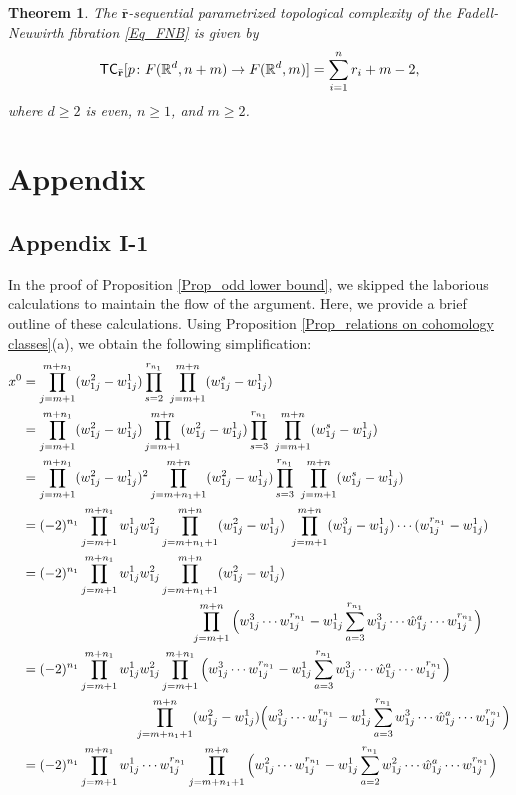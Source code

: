 \documentclass[12pt,oneside,reqno]{amsart}
\theoremstyle{plain}
\newtheorem{theorem}{Theorem}[section]
\theoremstyle{definition}
\theoremstyle{remark}
\newcommand{\sect}{\setcounter{figure}{0}\section}
\newcommand{\TC}{{\sf {TC}}}
\newcommand{\br}{\bar{\mathbf{r}}}
\begin{document}
\begin{theorem}\label{Th_even case}
The $\bar{\textbf{r}}$-sequential parametrized topological complexity of the Fadell-Neuwirth fibration \eqref{Eq_FNB} is given by $$\TC_{\br}[p\colon F(\mathbb{R}^d, n+ m) \to F(\mathbb{R}^d, m)] =\sum^{n}_{i=1} {r_i} + m -2,$$
where $d\geq 2$ is even, $n\geq 1$, and $m\geq 2$. 
\end{theorem}


\sect{Appendix}\label{sec:appendix}

\subsection{Appendix I-1}\label{Appendix for odd case}
In the proof of Proposition \ref{Prop_odd lower bound}, we skipped the laborious calculations to maintain the flow of the argument. Here, we provide a brief outline of these calculations. Using Proposition \ref{Prop_relations on cohomology classes}(a), we obtain the following simplification: 
\begin{align*}
x^0&=\prod^{m+n_1}_{j=m+1}(w^2_{1j} - w^1_{1j}) \prod^{r_{n_1}}_{s=2} ~\prod^{m+n}_{j=m+1} (w^s_{1j} - w^1_{1j}) \\
&= \prod^{m+n_1}_{j=m+1}(w^2_{1j} - w^1_{1j}) \prod^{m+n}_{j=m+1} (w^2_{1j} - w^1_{1j}) \prod^{r_{n_1}}_{s=3} ~\prod^{m+n}_{j=m+1} (w^s_{1j} - w^1_{1j})\\
&= \prod^{m+n_1}_{j=m+1}(w^2_{1j} - w^1_{1j})^2 \prod^{m+n}_{j=m+n_1+1}(w^2_{1j} - w^1_{1j}) \prod^{r_{n_1}}_{s=3} ~\prod^{m+n}_{j=m+1} (w^s_{1j} - w^1_{1j})\\
&= (-2)^{n_1}\prod^{m+n_1}_{j=m+1} w^1_{1j}w^2_{1j} \prod^{m+n}_{j=m+n_1+1}(w^2_{1j} - w^1_{1j}) ~\prod^{m+n}_{j=m+1} (w^3_{1j} - w^1_{1j})\cdots (w^{r_{n_1}}_{1j} - w^1_{1j})\\
&= (-2)^{n_1}\prod^{m+n_1}_{j=m+1} w^1_{1j}w^2_{1j} \prod^{m+n}_{j=m+n_1+1}(w^2_{1j} - w^1_{1j}) \\
& \hspace{4.5cm} \prod^{m+n}_{j=m+1} \Big(w^3_{1j} \cdots w^{r_{n_1}}_{1j} - w^1_{1j} \sum^{r_{n_1}}_{a=3}  w^3_{1j} \cdots \hat{w}^a_{1j}\cdots w^{r_{n_1}}_{1j} \Big)\\
&=(-2)^{n_1} \prod^{m+n_1}_{j=m+1} w^1_{1j}w^2_{1j}  \prod^{m+n_1}_{j=m+1} \Big(w^3_{1j} \cdots w^{r_{n_1}}_{1j} - w^1_{1j} \sum^{r_{n_1}}_{a=3}  w^3_{1j} \cdots \hat{w}^a_{1j}\cdots w^{r_{n_1}}_{1j} \Big)\\ 
&\hspace{3cm} \prod^{m+n}_{j=m+n_1+1} (w^2_{1j} - w^1_{1j}) \Big(w^3_{1j} \cdots w^{r_{n_1}}_{1j} - w^1_{1j} \sum^{r_{n_1}}_{a=3}  w^3_{1j} \cdots \hat{w}^a_{1j}\cdots w^{r_{n_1}}_{1j} \Big)  \\
&=(-2)^{n_1}\prod^{m+n_1}_{j=m+1} w^1_{1j} \cdots w^{r_{n_1}}_{1j}  \prod^{m+n}_{j=m+n_1+1} \Big(w^2_{1j} \cdots w^{r_{n_1}}_{1j} - w^1_{1j} \sum^{r_{n_1}}_{a=2}  w^2_{1j} \cdots \hat{w}^a_{1j}\cdots w^{r_{n_1}}_{1j} \Big)
\end{align*}
\end{document}
